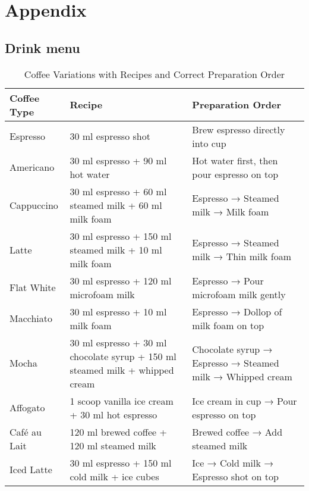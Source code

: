 \section*{Appendix}

\subsection*{Drink menu}

\begin{table}[h]
\centering
\renewcommand{\arraystretch}{1.2}
\begin{tabular}{|l|p{7cm}|p{5cm}|}
\hline
\textbf{Coffee Type} & \textbf{Recipe} & \textbf{Preparation Order} \\
\hline
Espresso & 30 ml espresso shot & Brew espresso directly into cup \\
\hline
Americano & 30 ml espresso + 90 ml hot water & Hot water first, then pour espresso on top \\
\hline
Cappuccino & 30 ml espresso + 60 ml steamed milk + 60 ml milk foam & Espresso → Steamed milk → Milk foam \\
\hline
Latte & 30 ml espresso + 150 ml steamed milk + 10 ml milk foam & Espresso → Steamed milk → Thin milk foam \\
\hline
Flat White & 30 ml espresso + 120 ml microfoam milk & Espresso → Pour microfoam milk gently \\
\hline
Macchiato & 30 ml espresso + 10 ml milk foam & Espresso → Dollop of milk foam on top \\
\hline
Mocha & 30 ml espresso + 30 ml chocolate syrup + 150 ml steamed milk + whipped cream & Chocolate syrup → Espresso → Steamed milk → Whipped cream \\
\hline
Affogato & 1 scoop vanilla ice cream + 30 ml hot espresso & Ice cream in cup → Pour espresso on top \\
\hline
Café au Lait & 120 ml brewed coffee + 120 ml steamed milk & Brewed coffee → Add steamed milk \\
\hline
Iced Latte & 30 ml espresso + 150 ml cold milk + ice cubes & Ice → Cold milk → Espresso shot on top \\
\hline
\end{tabular}
\caption{Coffee Variations with Recipes and Correct Preparation Order}
\end{table}

\newpage
